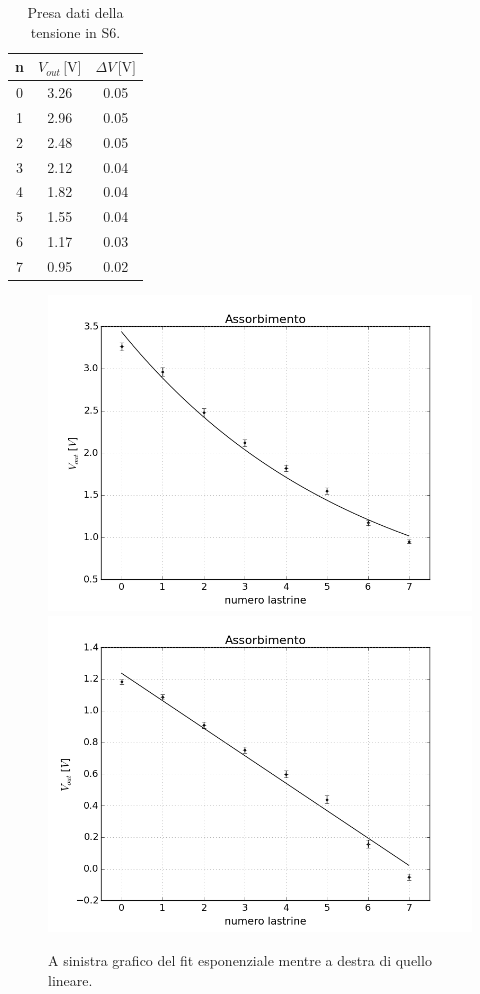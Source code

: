 \documentclass[10pt,a4paper]{article}
\begin{document}
\begin{table}[!htb]
\centering
\begin{tabular}{|c|c|c|}
\hline
n	&	$V_{out}\,\mbox{[V]}$	&	$\Delta V\,\mbox{[V]}$\\
\hline
0 &  3.26  &  0.05\\
\hline
1  & 2.96  &  0.05\\
\hline
2 &  2.48  &  0.05\\
\hline
3  & 2.12   & 0.04\\
\hline
4   &1.82   & 0.04\\
\hline
5   &1.55    &0.04\\
\hline
6   &1.17   & 0.03\\
\hline
7   &0.95    & 0.02\\
\hline
\end{tabular}
\caption{Presa dati della tensione in S6.\label{tab:abs1}}
\end{table}

\begin{figure}[!htb]
  \centering
  \includegraphics[scale=0.45]{plot-exp1.png}\includegraphics[scale=0.45]{plot-lin1.png}
\caption{A sinistra grafico del fit esponenziale mentre a destra di quello lineare.\label{plot1}}
\end{figure}
\end{document}
